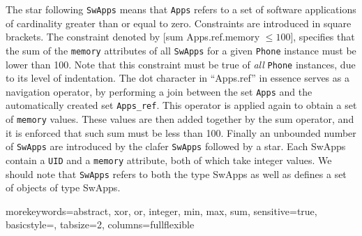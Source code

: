 \documentclass{article}
\begin{document}
%
The star following  \texttt{SwApps} means that \texttt{Apps} refers to a set of software applications of cardinality greater than or equal to zero. 
%
Constraints are introduced in  square brackets. The constraint denoted by [sum Apps.ref.memory $\le 100$], specifies that the sum of the \texttt{memory} attributes of all \texttt{SwApps} for a given \texttt{Phone} instance must be lower than 100. Note that this constraint must be true of \textit{all} \texttt{Phone} instances, due to its level of indentation.    
%
The dot character in ``Apps.ref''  in essence serves as a navigation operator, by performing a join between the set \texttt{Apps} and the automatically created set \texttt{Apps\_ref}. This operator is applied again to obtain a set of \texttt{memory} values. These values are then added together by the sum operator, and it is enforced that such sum must be less than 100.
%
Finally an unbounded number of \texttt{SwApps} are introduced by the clafer \texttt{SwApps} followed by a star. Each SwApps contain a \texttt{UID} and a \texttt{memory} attribute, both of which take integer values.  
%
We should note that \texttt{SwApps} refers to both the type SwApps as well as defines a set of objects of type SwApps.

{morekeywords={abstract, xor, or, integer, min, max, sum},
sensitive=true,
basicstyle={\sffamily\small},
tabsize=2,
columns=fullflexible
}
\end{document}
